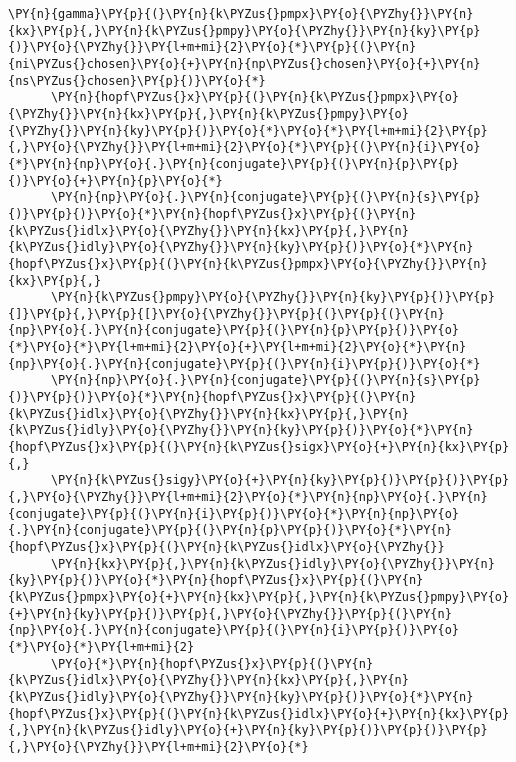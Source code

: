 \begin{Verbatim}[commandchars=\\\{\}]
      \PY{n}{gamma}\PY{p}{(}\PY{n}{k\PYZus{}pmpx}\PY{o}{\PYZhy{}}\PY{n}{kx}\PY{p}{,}\PY{n}{k\PYZus{}pmpy}\PY{o}{\PYZhy{}}\PY{n}{ky}\PY{p}{)}\PY{o}{\PYZhy{}}\PY{l+m+mi}{2}\PY{o}{*}\PY{p}{(}\PY{n}{ni\PYZus{}chosen}\PY{o}{+}\PY{n}{np\PYZus{}chosen}\PY{o}{+}\PY{n}{ns\PYZus{}chosen}\PY{p}{)}\PY{o}{*}
      \PY{n}{hopf\PYZus{}x}\PY{p}{(}\PY{n}{k\PYZus{}pmpx}\PY{o}{\PYZhy{}}\PY{n}{kx}\PY{p}{,}\PY{n}{k\PYZus{}pmpy}\PY{o}{\PYZhy{}}\PY{n}{ky}\PY{p}{)}\PY{o}{*}\PY{o}{*}\PY{l+m+mi}{2}\PY{p}{,}\PY{o}{\PYZhy{}}\PY{l+m+mi}{2}\PY{o}{*}\PY{p}{(}\PY{n}{i}\PY{o}{*}\PY{n}{np}\PY{o}{.}\PY{n}{conjugate}\PY{p}{(}\PY{n}{p}\PY{p}{)}\PY{o}{+}\PY{n}{p}\PY{o}{*}
      \PY{n}{np}\PY{o}{.}\PY{n}{conjugate}\PY{p}{(}\PY{n}{s}\PY{p}{)}\PY{p}{)}\PY{o}{*}\PY{n}{hopf\PYZus{}x}\PY{p}{(}\PY{n}{k\PYZus{}idlx}\PY{o}{\PYZhy{}}\PY{n}{kx}\PY{p}{,}\PY{n}{k\PYZus{}idly}\PY{o}{\PYZhy{}}\PY{n}{ky}\PY{p}{)}\PY{o}{*}\PY{n}{hopf\PYZus{}x}\PY{p}{(}\PY{n}{k\PYZus{}pmpx}\PY{o}{\PYZhy{}}\PY{n}{kx}\PY{p}{,}
      \PY{n}{k\PYZus{}pmpy}\PY{o}{\PYZhy{}}\PY{n}{ky}\PY{p}{)}\PY{p}{]}\PY{p}{,}\PY{p}{[}\PY{o}{\PYZhy{}}\PY{p}{(}\PY{p}{(}\PY{n}{np}\PY{o}{.}\PY{n}{conjugate}\PY{p}{(}\PY{n}{p}\PY{p}{)}\PY{o}{*}\PY{o}{*}\PY{l+m+mi}{2}\PY{o}{+}\PY{l+m+mi}{2}\PY{o}{*}\PY{n}{np}\PY{o}{.}\PY{n}{conjugate}\PY{p}{(}\PY{n}{i}\PY{p}{)}\PY{o}{*}
      \PY{n}{np}\PY{o}{.}\PY{n}{conjugate}\PY{p}{(}\PY{n}{s}\PY{p}{)}\PY{p}{)}\PY{o}{*}\PY{n}{hopf\PYZus{}x}\PY{p}{(}\PY{n}{k\PYZus{}idlx}\PY{o}{\PYZhy{}}\PY{n}{kx}\PY{p}{,}\PY{n}{k\PYZus{}idly}\PY{o}{\PYZhy{}}\PY{n}{ky}\PY{p}{)}\PY{o}{*}\PY{n}{hopf\PYZus{}x}\PY{p}{(}\PY{n}{k\PYZus{}sigx}\PY{o}{+}\PY{n}{kx}\PY{p}{,}
      \PY{n}{k\PYZus{}sigy}\PY{o}{+}\PY{n}{ky}\PY{p}{)}\PY{p}{)}\PY{p}{,}\PY{o}{\PYZhy{}}\PY{l+m+mi}{2}\PY{o}{*}\PY{n}{np}\PY{o}{.}\PY{n}{conjugate}\PY{p}{(}\PY{n}{i}\PY{p}{)}\PY{o}{*}\PY{n}{np}\PY{o}{.}\PY{n}{conjugate}\PY{p}{(}\PY{n}{p}\PY{p}{)}\PY{o}{*}\PY{n}{hopf\PYZus{}x}\PY{p}{(}\PY{n}{k\PYZus{}idlx}\PY{o}{\PYZhy{}}
      \PY{n}{kx}\PY{p}{,}\PY{n}{k\PYZus{}idly}\PY{o}{\PYZhy{}}\PY{n}{ky}\PY{p}{)}\PY{o}{*}\PY{n}{hopf\PYZus{}x}\PY{p}{(}\PY{n}{k\PYZus{}pmpx}\PY{o}{+}\PY{n}{kx}\PY{p}{,}\PY{n}{k\PYZus{}pmpy}\PY{o}{+}\PY{n}{ky}\PY{p}{)}\PY{p}{,}\PY{o}{\PYZhy{}}\PY{p}{(}\PY{n}{np}\PY{o}{.}\PY{n}{conjugate}\PY{p}{(}\PY{n}{i}\PY{p}{)}\PY{o}{*}\PY{o}{*}\PY{l+m+mi}{2}
      \PY{o}{*}\PY{n}{hopf\PYZus{}x}\PY{p}{(}\PY{n}{k\PYZus{}idlx}\PY{o}{\PYZhy{}}\PY{n}{kx}\PY{p}{,}\PY{n}{k\PYZus{}idly}\PY{o}{\PYZhy{}}\PY{n}{ky}\PY{p}{)}\PY{o}{*}\PY{n}{hopf\PYZus{}x}\PY{p}{(}\PY{n}{k\PYZus{}idlx}\PY{o}{+}\PY{n}{kx}\PY{p}{,}\PY{n}{k\PYZus{}idly}\PY{o}{+}\PY{n}{ky}\PY{p}{)}\PY{p}{)}\PY{p}{,}\PY{o}{\PYZhy{}}\PY{l+m+mi}{2}\PY{o}{*}

\end{Verbatim}
